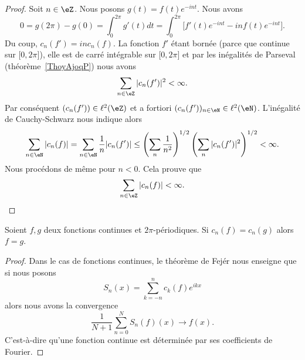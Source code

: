 \begin{proof}
    Soit \( n\in \eZ\). Nous posons \( g(t)=f(t) e^{-int}\). Nous avons
    \begin{equation}
        0=g(2\pi)-g(0)=\int_0^{2\pi}g'(t)dt=\int_0^{2\pi}\big[ f'(t) e^{-int}-inf(t) e^{-int} \big].
    \end{equation}
    Du coup, \( c_n(f')=inc_n(f)\). La fonction \( f'\) étant bornée (parce que continue sur \( \mathopen[ 0 , 2\pi \mathclose]\)), elle est de carré intégrable sur \( \mathopen[ 0 , 2\pi \mathclose]\) et par les inégalités de Parseval (théorème~\ref{ThoyAjoqP}) nous avons
    \begin{equation}
        \sum_{n\in \eZ}| c_n(f') |^2<\infty.
    \end{equation}
    Par conséquent \( (c_n(f'))\in \ell^2(\eZ)\) et a fortiori \( (c_n(f'))_{n\in \eN}\in \ell^2(\eN)\). L'inégalité de Cauchy-Schwarz nous indique alors
    \begin{equation}
        \sum_{n\in \eN}| c_n(f) |=\sum_{n\in \eN}\frac{1}{ n }| c_n(f') |\leq \left( \sum_n\frac{1}{ n^2 } \right)^{1/2}\left( \sum_{n}| c_n(f') |^2 \right)^{1/2}<\infty.
    \end{equation}
    Nous procédons de même pour \( n<0\). Cela prouve que
    \begin{equation}
        \sum_{n\in \eZ}| c_n(f) |<\infty.
    \end{equation}
\end{proof}

\begin{corollary}   \label{CordgtXlC}
    Soient \( f,g\) deux fonctions continues et \( 2\pi\)-périodiques. Si \( c_n(f)=c_n(g)\) alors \( f=g\).
\end{corollary}

\begin{proof}
    Dans le cas de fonctions continues, le théorème de Fejér nous enseigne que si nous posons
    \begin{equation}
        S_n(x)=\sum_{k=-n}^{n}c_k(f) e^{ikx}
    \end{equation}
    alors nous avons la convergence
    \begin{equation}
        \frac{1}{ N+1 }\sum_{n=0}^NS_n(f)(x)\to f(x).
    \end{equation}
    C'est-à-dire qu'une fonction continue est déterminée par ses coefficients de Fourier.
\end{proof}

